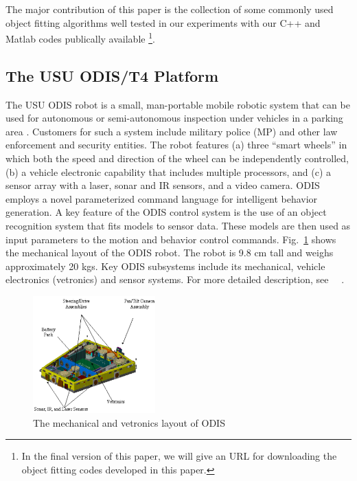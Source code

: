 \documentclass{cdcarta4}
\begin{document}
The major contribution of this paper is the collection of some commonly used object fitting algorithms well tested in our experiments with our C++ and Matlab codes publically available 
\footnote{In the final version of this paper, we will give an URL for downloading the object fitting codes developed in this paper.}.


\subsection{The USU ODIS/T4 Platform}

The USU ODIS  robot is   a small, man-portable mobile robotic system that can be used for autonomous or 
 semi-autonomous inspection under vehicles in a parking area \cite{moore_csm}. Customers for such a system include military police (MP) and other law enforcement and security entities. The robot features (a) three ``smart wheels''  in which both the speed and direction of the wheel can be independently controlled, (b) a vehicle electronic capability that includes multiple processors, and (c) a sensor array with a laser, sonar and IR sensors, and a video camera. ODIS employs a novel parameterized command language for intelligent behavior generation. A key feature of the ODIS control system is the use of an object recognition system that fits models to sensor data. These models are then used as input parameters to the motion and behavior control commands.
Fig.~\ref{fig:odis1} shows the mechanical layout of the ODIS robot. The robot is 9.8 cm tall and weighs approximately 20 kgs. Key ODIS subsystems include its mechanical, vehicle electronics (vetronics) and sensor systems.  For more detailed description, see ~\cite{odis_spie01}~\cite{odis_icra01}.
%
%
\begin{figure}[!htb]
    \center
    \includegraphics[width=7.cm,height=4.5cm]{img/odis1}
    \caption{The mechanical and vetronics layout of ODIS}  \label{fig:odis1}
\end{figure} 
\end{document}
